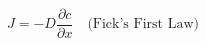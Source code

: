 \documentclass[preview]{standalone}
\begin{document}
\[J = -D \frac{\partial c}{\partial x} \quad \text{(Fick's First Law)} \tag{2.4}\]
\end{document}
